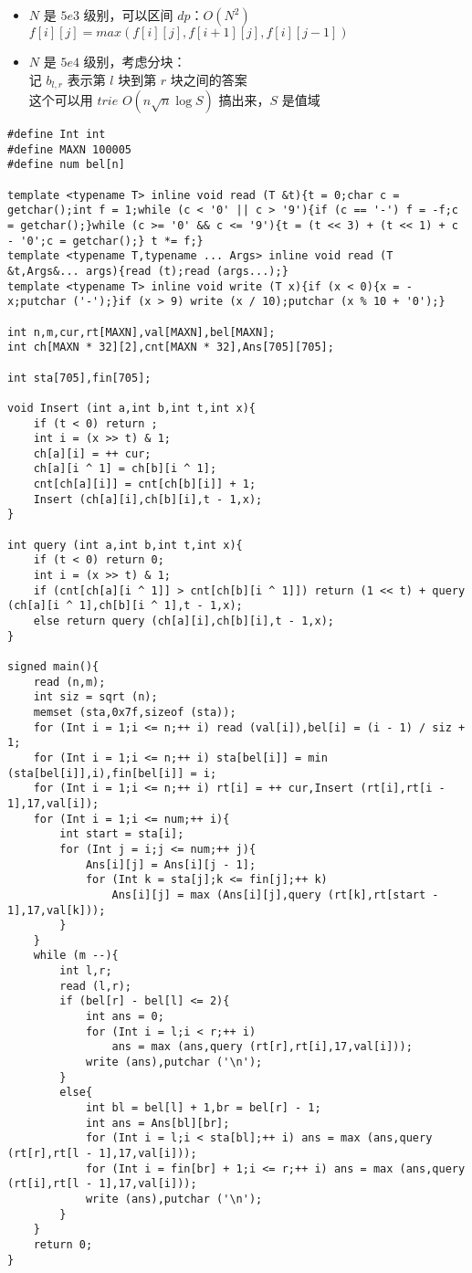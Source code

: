 \documentclass[E:/GsjzTle/main/main.tex]{subfiles}
\begin{document}
\begin{itemize}
\item
  \(N\) 是 \(5e3\) 级别，可以区间 \(dp\)：\(O(N^2)\)\\
  \(f[i][j] = max(f[i][j] , f[i+1][j],f[i][j - 1])\)
\item
  \(N\) 是 \(5e4\) 级别，考虑分块：\\
  记 \(b_{l,r}\) 表示第 \(l\) 块到第 \(r\) 块之间的答案\\
  这个可以用 \(trie\) \(O(n\sqrt{n}\log S)\) 搞出来，\(S\) 是值域
\end{itemize}

\begin{lstlisting}
#define Int int
#define MAXN 100005
#define num bel[n]

template <typename T> inline void read (T &t){t = 0;char c = getchar();int f = 1;while (c < '0' || c > '9'){if (c == '-') f = -f;c = getchar();}while (c >= '0' && c <= '9'){t = (t << 3) + (t << 1) + c - '0';c = getchar();} t *= f;}
template <typename T,typename ... Args> inline void read (T &t,Args&... args){read (t);read (args...);}
template <typename T> inline void write (T x){if (x < 0){x = -x;putchar ('-');}if (x > 9) write (x / 10);putchar (x % 10 + '0');}

int n,m,cur,rt[MAXN],val[MAXN],bel[MAXN];
int ch[MAXN * 32][2],cnt[MAXN * 32],Ans[705][705];

int sta[705],fin[705];

void Insert (int a,int b,int t,int x){
	if (t < 0) return ;
	int i = (x >> t) & 1;
	ch[a][i] = ++ cur;
	ch[a][i ^ 1] = ch[b][i ^ 1];
	cnt[ch[a][i]] = cnt[ch[b][i]] + 1;
	Insert (ch[a][i],ch[b][i],t - 1,x);
}

int query (int a,int b,int t,int x){
	if (t < 0) return 0;
	int i = (x >> t) & 1;
	if (cnt[ch[a][i ^ 1]] > cnt[ch[b][i ^ 1]]) return (1 << t) + query (ch[a][i ^ 1],ch[b][i ^ 1],t - 1,x);
	else return query (ch[a][i],ch[b][i],t - 1,x);
}

signed main(){
	read (n,m);
	int siz = sqrt (n);
	memset (sta,0x7f,sizeof (sta));
	for (Int i = 1;i <= n;++ i) read (val[i]),bel[i] = (i - 1) / siz + 1;
	for (Int i = 1;i <= n;++ i) sta[bel[i]] = min (sta[bel[i]],i),fin[bel[i]] = i;
	for (Int i = 1;i <= n;++ i) rt[i] = ++ cur,Insert (rt[i],rt[i - 1],17,val[i]);
	for (Int i = 1;i <= num;++ i){
		int start = sta[i];
		for (Int j = i;j <= num;++ j){
			Ans[i][j] = Ans[i][j - 1];
			for (Int k = sta[j];k <= fin[j];++ k)
				Ans[i][j] = max (Ans[i][j],query (rt[k],rt[start - 1],17,val[k]));
		}
	}
	while (m --){
		int l,r;
		read (l,r);
		if (bel[r] - bel[l] <= 2){
			int ans = 0;
			for (Int i = l;i < r;++ i)
				ans = max (ans,query (rt[r],rt[i],17,val[i]));
			write (ans),putchar ('\n');
		}
		else{
			int bl = bel[l] + 1,br = bel[r] - 1;
			int ans = Ans[bl][br];
			for (Int i = l;i < sta[bl];++ i) ans = max (ans,query (rt[r],rt[l - 1],17,val[i]));
			for (Int i = fin[br] + 1;i <= r;++ i) ans = max (ans,query (rt[i],rt[l - 1],17,val[i]));
			write (ans),putchar ('\n');
		}
	}
	return 0;
}
\end{lstlisting}
\end{document}
